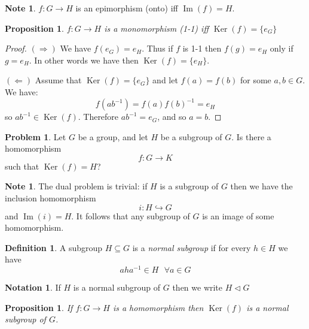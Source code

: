 \documentclass[12pt, letterpaper, oneside]{article}
\theoremstyle{plain}
\newtheorem{proposition}[theorem]{Proposition}
\theoremstyle{definition}
\newtheorem{definition}[theorem]{Definition}
\newtheorem{notation}[theorem]{Notation}
\newtheorem{note}[theorem]{Note}
\newtheorem{problem}[theorem]{Problem}
\newcommand{\Ra}{\Rightarrow}
\newcommand{\La}{\Leftarrow}
\newcommand{\hra}{\hookrightarrow}
\renewcommand{\Im}{\operatorname{Im}}
\newcommand{\Ker}{\operatorname{Ker}}
\newcommand{\vs}{\vskip 5mm}
\begin{document}
\begin{note}
$f\colon G\to H$ is an epimorphism (onto) iff $\Im(f) = H$. 
\end{note}

\vs

\begin{proposition}
\label{PROP_MONOGRKER}
$f\colon G\to H$ is a monomorphism (1-1) iff $\Ker(f) = \{e_{G}\}$
\end{proposition}

\begin{proof}
$(\Ra)$ We have $f(e_{G})= e_{H}$. Thus if $f$ is 1-1 then $f(g)=e_{H}$ only if 
$g=e_{H}$. In other words we have then $\Ker(f) = \{e_{H}\}$.  

$(\La)$ Assume that $\Ker(f) = \{e_{G}\}$ and let $f(a)= f(b)$ for some $a, b\in G$. 
We have:
$$f(ab^{-1})= f(a)f(b)^{-1} = e_{H}$$
so $ab^{-1}\in \Ker(f)$. Therefore $ab^{-1}= e_{G}$, and so $a = b$. 

\end{proof}

\vs 

\begin{problem}
Let $G$ be a group, and let $H$ be a subgroup of $G$. Is there a homomorphism 
$$f\colon G \to K$$
such that $\Ker(f) = H$?
\end{problem}

\vs

\begin{note}
The dual problem is trivial: if $H$ is a subgroup of $G$ then we have the 
inclusion homomorphism
$$i\colon H \hra G$$
and $\Im(i) = H$. It follows that any subgroup of $G$ is an image of some homomorphism.  
\end{note}

\vs

\begin{definition}
A subgroup $H\subseteq G$ is a \emph{normal subgroup} if for every $h\in H$ 
we have 
$$aha^{-1} \in H \  \ \ \forall a\in G$$
\end{definition} 

\begin{notation}
If $H$ is a normal subgroup of $G$ then we write $H\lhd G$
\end{notation}

\vs 

\begin{proposition}
If $f\colon G\to H$ is a homomorphism then $\Ker(f)$ is a normal subgroup of $G$.
\end{proposition}
\end{document}
